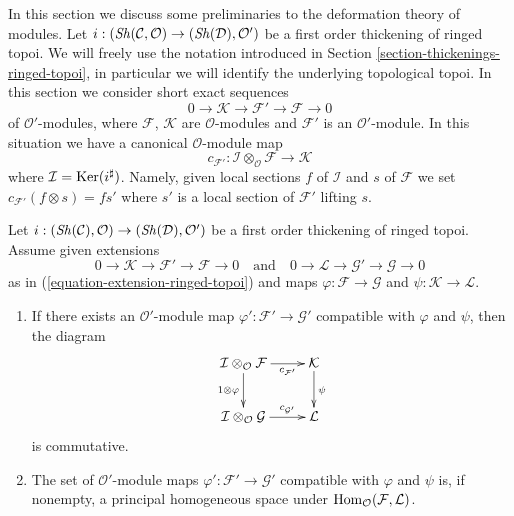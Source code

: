 \noindent
In this section we discuss some preliminaries to the deformation theory
of modules. Let
$i : (\mathop{\mathit{Sh}}\nolimits(\mathcal{C}, \mathcal{O}) \to (\mathop{\mathit{Sh}}\nolimits(\mathcal{D}), \mathcal{O}')$
be a first order thickening of ringed topoi. We will freely use the notation
introduced in Section \ref{section-thickenings-ringed-topoi},
in particular we will identify the underlying topological topoi.
In this section we consider short exact sequences
\begin{equation}
\label{equation-extension-ringed-topoi}
0 \to \mathcal{K} \to \mathcal{F}' \to \mathcal{F} \to 0
\end{equation}
of $\mathcal{O}'$-modules, where $\mathcal{F}$, $\mathcal{K}$ are
$\mathcal{O}$-modules and $\mathcal{F}'$ is an $\mathcal{O}'$-module.
In this situation we have a canonical $\mathcal{O}$-module map
$$
c_{\mathcal{F}'} :
\mathcal{I} \otimes_\mathcal{O} \mathcal{F}
\longrightarrow
\mathcal{K}
$$
where $\mathcal{I} = \mathop{\mathrm{Ker}}(i^\sharp)$.
Namely, given local sections $f$ of $\mathcal{I}$ and $s$
of $\mathcal{F}$ we set $c_{\mathcal{F}'}(f \otimes s) = fs'$
where $s'$ is a local section of $\mathcal{F}'$ lifting $s$.

\begin{lemma}
\label{lemma-inf-map-ringed-topoi}
Let $i : (\mathop{\mathit{Sh}}\nolimits(\mathcal{C}), \mathcal{O}) \to (\mathop{\mathit{Sh}}\nolimits(\mathcal{D}), \mathcal{O}')$
be a first order thickening of ringed topoi. Assume given
extensions
$$
0 \to \mathcal{K} \to \mathcal{F}' \to \mathcal{F} \to 0
\quad\text{and}\quad
0 \to \mathcal{L} \to \mathcal{G}' \to \mathcal{G} \to 0
$$
as in (\ref{equation-extension-ringed-topoi})
and maps $\varphi : \mathcal{F} \to \mathcal{G}$ and
$\psi : \mathcal{K} \to \mathcal{L}$.
\begin{enumerate}
\item If there exists an $\mathcal{O}'$-module
map $\varphi' : \mathcal{F}' \to \mathcal{G}'$ compatible with $\varphi$
and $\psi$, then the diagram
$$
\xymatrix{
\mathcal{I} \otimes_\mathcal{O} \mathcal{F}
\ar[r]_-{c_{\mathcal{F}'}} \ar[d]_{1 \otimes \varphi} &
\mathcal{K} \ar[d]^\psi \\
\mathcal{I} \otimes_\mathcal{O} \mathcal{G}
\ar[r]^-{c_{\mathcal{G}'}} &
\mathcal{L}
}
$$
is commutative.
\item The set of $\mathcal{O}'$-module
maps $\varphi' : \mathcal{F}' \to \mathcal{G}'$ compatible with $\varphi$
and $\psi$ is, if nonempty, a principal homogeneous space under
$\mathop{\mathrm{Hom}}\nolimits_\mathcal{O}(\mathcal{F}, \mathcal{L})$.
\end{enumerate}
\end{lemma}


